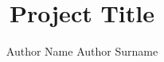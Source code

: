 \documentclass[letterpaper, 10 pt, journal, twoside]{IEEEtran}
\begin{document}
\title{Project Title}


\author{Author Name Author Surname}


\maketitle


\IEEEpeerreviewmaketitle








\end{document}
